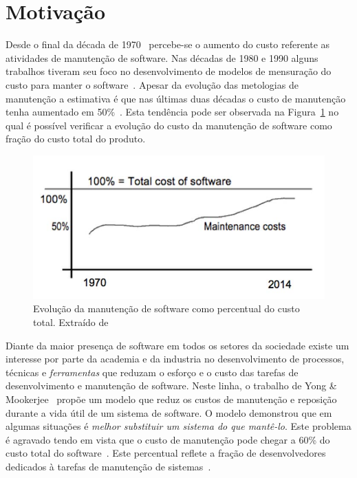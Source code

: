 \section{Motivação}
\label{sec:intro-motivacao}


Desde o final da década de 1970~\cite{Zelkowitz:1979:PSE:578504} percebe-se o aumento do custo
referente as atividades de  manutenção de software. Nas décadas de 1980 e 1990 alguns trabalhos
tiveram seu foco no desenvolvimento de modelos de mensuração do custo para manter o
software~\cite{Herrin:1985:SMC:323287.323383,hirota1994approach}. Apesar da evolução das metologias
de manutenção a estimativa é que nas últimas duas décadas o custo de manutenção tenha aumentado em
50\%~\cite{koskinen2010software}. Esta tendência pode ser observada na
Figura~\ref{fig:software-maintence-costs} no qual é possível verificar a evolução do custo da
manutenção de software como fração do custo total do produto.

\begin{figure}
\centering
\includegraphics[width=0.7\linewidth]{./chapter-intro/img/software-maintence-costs}
\caption{Evolução da manutenção de software como percentual do custo total.	Extraído de~\cite{engelbertink2010save}}
\label{fig:software-maintence-costs}
\end{figure}

Diante da maior presença de software em todos os setores da sociedade
existe um interesse por parte da academia e da industria no desenvolvimento de
processos, técnicas e \textit{ferramentas} que reduzam o esforço e o custo das tarefas
de desenvolvimento e manutenção de software. Neste linha, o trabalho de Yong \& Mookerjee~\cite{1423995}  propõe um modelo que reduz os custos de manutenção e reposição durante a vida útil de um sistema de software. O modelo demonstrou que em algumas situações é \textit{melhor substituir um sistema do que mantê-lo}. Este problema é agravado tendo em vista que o custo de manutenção pode chegar a 60\% do custo total do software~\cite{kaur2015review}. Este percentual reflete a fração de desenvolvedores dedicados à tarefas de manutenção de sistemas~\cite{Zhang_2003}.

